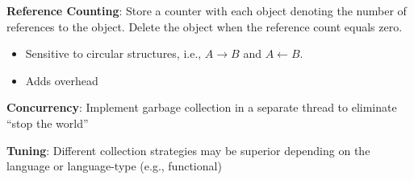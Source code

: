 \documentclass[10pt,twocolumn]{report}
\begin{document}
  \textbf{Reference Counting}: Store a counter with each object denoting the number of references to the object.  Delete the object when the reference count equals zero.
  \begin{itemize}
    \item Sensitive to circular structures, i.e., $A \rightarrow B$ and $A \leftarrow B$.
    \item Adds overhead
  \end{itemize}

  \textbf{Concurrency}: Implement garbage collection in a separate thread to eliminate ``stop the world''
  
  \textbf{Tuning}: Different collection strategies may be superior depending on the language or language-type (e.g., functional)
\end{document}
